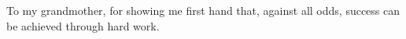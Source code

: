 \thispagestyle{empty}
    \null{}
        \begin{flushright}
            \small
            \singlespacing
            To my grandmother, for showing me first hand that, against all odds, success can be achieved through hard work. 
        \end{flushright}
\null
